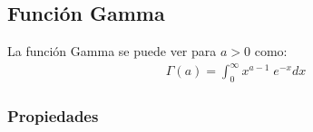 \documentclass[12pt, fleqn]{report}                             %
\theoremstyle{break}                                            %
\begin{document}
            \subsection{Función Gamma}

                La función Gamma se puede ver para $a > 0$ como:
                \begin{align*}
                    \Gamma(a) = \int_0^\infty x^{a - 1} \; e^{-x} dx
                \end{align*}

                \subsubsection{Propiedades}
\end{document}

